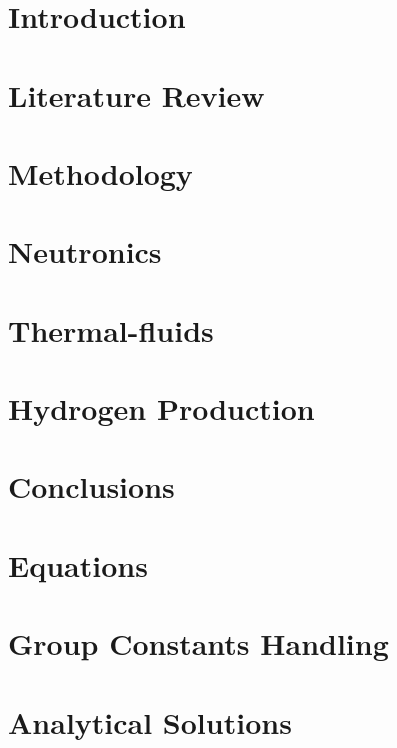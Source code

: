 \documentclass[edeposit,fullpage]{uiucthesis2018}
\begin{document}
\tableofcontents
\listoftables
\listoffigures


\pagebreak
\mainmatter

\chapter{Introduction}


\chapter{Literature Review}


\chapter{Methodology}


\chapter{Neutronics}


\chapter{Thermal-fluids}


\chapter{Hydrogen Production}


\chapter{Conclusions}


\begin{appendices}
	\chapter{Equations}
	
	\chapter{Group Constants Handling}
	
	\chapter{Analytical Solutions}
	
\end{appendices}
\end{document}
